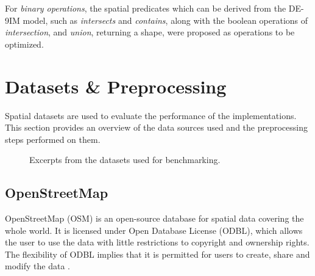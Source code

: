 For \emph{binary operations}, the spatial predicates which can be derived from the DE-9IM model, such as \emph{intersects} and \emph{contains}, along with the boolean operations of \emph{intersection}, and \emph{union}, returning a shape, were proposed as operations to be optimized.

\section{Datasets \& Preprocessing}
\label{sec:datasets}
Spatial datasets are used to evaluate the performance of the implementations. This section provides an overview of the data sources used and the preprocessing steps performed on them.
\begin{figure}[H]%
    \centering
    \qquad
    \caption{Excerpts from the datasets used for benchmarking.}%
    \label{fig:datapreview}%
\end{figure}

\subsection{OpenStreetMap}
OpenStreetMap (OSM) is an open-source database for spatial data covering the whole world. It is licensed under Open Database License (ODBL), which allows the user to use the data with little restrictions to copyright and ownership rights. The flexibility of ODBL implies that it is permitted for users to create, share and modify the data \cite{osmlicense}. 

